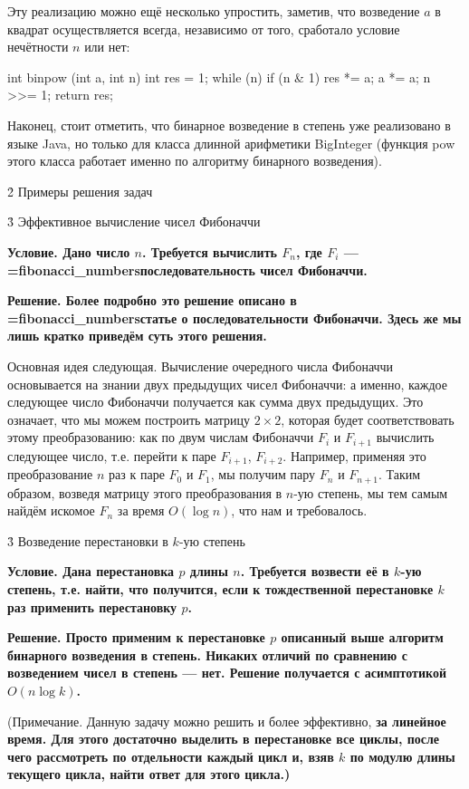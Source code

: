 Эту реализацию можно ещё несколько упростить, заметив, что возведение $a$ в квадрат осуществляется всегда, независимо от того, сработало условие нечётности $n$ или нет:

\code
int binpow (int a, int n) {
	int res = 1;
	while (n) {
		if (n & 1)
			res *= a;
		a *= a;
		n >>= 1;
	}
	return res;
}
\endcode

Наконец, стоит отметить, что бинарное возведение в степень уже реализовано в языке Java, но только для класса длинной арифметики BigInteger (функция pow этого класса работает именно по алгоритму бинарного возведения).



\h2{ Примеры решения задач }


\h3{ Эффективное вычисление чисел Фибоначчи }

\bf{Условие}. Дано число $n$. Требуется вычислить $F_n$, где $F_i$ --- \algohref=fibonacci_numbers{последовательность чисел Фибоначчи}.

\bf{Решение}. Более подробно это решение описано в \algohref=fibonacci_numbers{статье о последовательности Фибоначчи}. Здесь же мы лишь кратко приведём суть этого решения.

Основная идея следующая. Вычисление очередного числа Фибоначчи основывается на знании двух предыдущих чисел Фибоначчи: а именно, каждое следующее число Фибоначчи получается как сумма двух предыдущих. Это означает, что мы можем построить матрицу $2 \times 2$, которая будет соответствовать этому преобразованию: как по двум числам Фибоначчи $F_i$ и $F_{i+1}$ вычислить следующее число, т.е. перейти к паре $F_{i+1}$, $F_{i+2}$. Например, применяя это преобразование $n$ раз к паре $F_0$ и $F_1$, мы получим пару $F_n$ и $F_{n+1}$. Таким образом, возведя матрицу этого преобразования в $n$-ую степень, мы тем самым найдём искомое $F_n$ за время $O (\log n)$, что нам и требовалось.


\h3{ Возведение перестановки в $k$-ую степень }

\bf{Условие}. Дана перестановка $p$ длины $n$. Требуется возвести её в $k$-ую степень, т.е. найти, что получится, если к тождественной перестановке $k$ раз применить перестановку $p$.

\bf{Решение}. Просто применим к перестановке $p$ описанный выше алгоритм бинарного возведения в степень. Никаких отличий по сравнению с возведением чисел в степень --- нет. Решение получается с асимптотикой $O (n \log k)$.

(Примечание. Данную задачу можно решить и более эффективно, \bf{за линейное время}. Для этого достаточно выделить в перестановке все циклы, после чего рассмотреть по отдельности каждый цикл и, взяв $k$ по модулю длины текущего цикла, найти ответ для этого цикла.)


